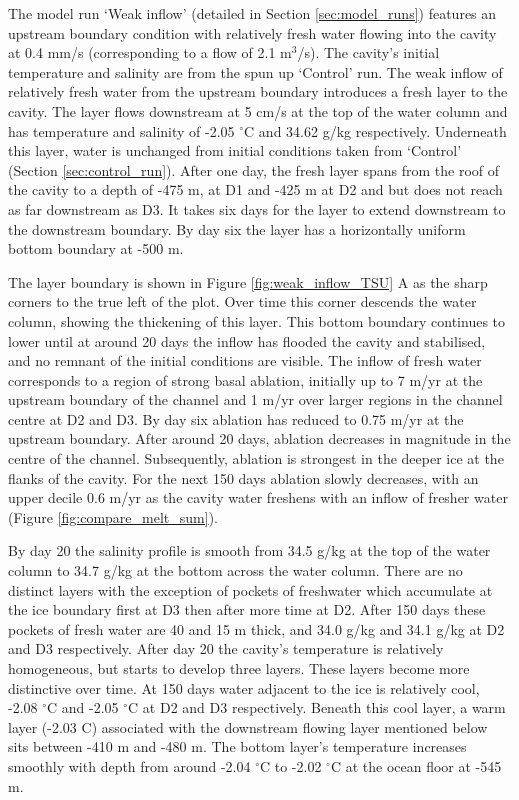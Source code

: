 The model run `Weak inflow' (detailed in Section \ref{sec:model_runs}) features an upstream boundary condition with relatively fresh water flowing into the cavity at 0.4 mm/s (corresponding to a flow of 2.1 $\mathrm{m}^3$/s). The cavity's initial temperature and salinity are from the spun up `Control' run.
The weak inflow of relatively fresh water from the upstream boundary introduces a fresh layer to the cavity. The layer flows downstream at 5 cm/s at the top of the water column and has temperature and salinity of -2.05 $^{\circ}$C and 34.62 g/kg respectively. Underneath this layer, water is unchanged from initial conditions taken from `Control' (Section \ref{sec:control_run}). After one day, the fresh layer spans from the roof of the cavity to a depth of -475 m, at D1 and -425 m at D2 and but does not reach as far downstream as D3. It takes six days for the layer to extend downstream to the downstream boundary. By day six the layer has a horizontally uniform bottom boundary at -500 m. 

The layer boundary is shown in Figure \ref{fig:weak_inflow_TSU} A as the sharp corners to the true left of the plot. Over time this corner descends the water column, showing the thickening of this layer.  This bottom boundary continues to lower until at around 20 days the inflow has flooded the cavity and stabilised, and no remnant of the initial conditions are visible.  
The inflow of fresh water corresponds to a region of strong basal ablation, initially up to 7 m/yr at the upstream boundary of the channel and 1 m/yr over larger regions in the channel centre at D2 and D3. By day six ablation has reduced to 0.75 m/yr at the upstream boundary. After around 20 days, ablation decreases in magnitude in the centre of the channel. Subsequently, ablation is strongest in the deeper ice at the flanks of the cavity. For the next 150 days ablation slowly decreases, with an upper decile 0.6 m/yr as the cavity water freshens with an inflow of fresher water (Figure \ref{fig:compare_melt_sum}). 

By day 20 the salinity profile is smooth from 34.5  g/kg at the top of the water column to 34.7 g/kg at the bottom across the water column. There are no distinct layers with the exception of pockets of freshwater which accumulate at the ice boundary first at D3 then after more time at D2. After 150 days these pockets of fresh water are 40 and 15 m thick, and 34.0 g/kg and 34.1 g/kg at D2 and D3 respectively. After day 20 the cavity's temperature is relatively homogeneous, but starts to develop three layers. These layers become more distinctive over time. At 150 days water adjacent to the ice is relatively cool, -2.08 $^{\circ}$C and -2.05 $^{\circ}$C at D2 and D3 respectively. Beneath this cool layer, a warm layer (-2.03 \textdegree C) associated with the downstream flowing layer mentioned below sits between -410 m and -480 m. The bottom layer's temperature increases smoothly with depth from around -2.04 $^{\circ}$C to -2.02 $^{\circ}$C at the ocean floor at -545 m.  

